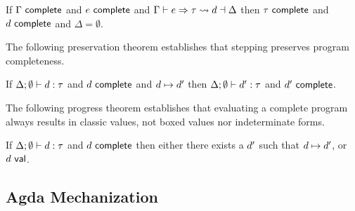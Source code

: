 \begin{thm}
      If $\Gamma~\mathsf{complete}$ and $e~\mathsf{complete}$
      and $\Gamma \vdash e \Rightarrow \tau \leadsto d \dashv \Delta$
      then $\tau~\mathsf{complete}$ and $d~\mathsf{complete}$ and $\Delta = \emptyset$.
\end{thm}

The following preservation theorem establishes that stepping preserves
program completeness.
\begin{thm}
  If $\Delta; \emptyset \vdash d : \tau$
  and $d~\mathsf{complete}$
  and $d \mapsto d'$
  then $\Delta; \emptyset \vdash d' : \tau$
  and $d'~\mathsf{complete}$.
\end{thm}

The following progress theorem establishes that evaluating a complete
program always results in classic values, not boxed values nor
indeterminate forms.
%
\begin{thm}
  If $\Delta; \emptyset \vdash d : \tau$ and $d~\mathsf{complete}$
  then either there exists a $d'$ such that
  $d \mapsto d'$, or $d~\mathsf{val}$.
\end{thm}




\vspace{-3px}
\subsection{Agda Mechanization}
\label{sec:agda-mechanization}
\vspace{-2px}

